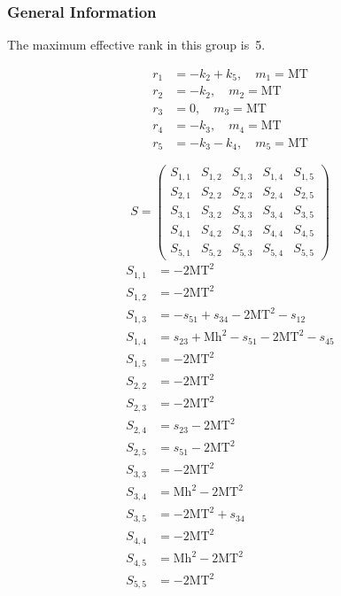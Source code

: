 \documentclass[a4paper]{article}
\begin{document}
\subsubsection*{General Information}
The maximum effective rank in this group is~5.

\begin{subequations}
\begin{align}
r_{1} &= -k_{2}+k_{5},\quad m_{1} = \text{MT}\\
r_{2} &= -k_{2},\quad m_{2} = \text{MT}\\
r_{3} &= 0,\quad m_{3} = \text{MT}\\
r_{4} &= -k_{3},\quad m_{4} = \text{MT}\\
r_{5} &= -k_{3}-k_{4},\quad m_{5} = \text{MT}
\end{align}
\end{subequations}

\begin{equation}
S=\left(\begin{array}{ccccc}
   S_{1,1}&
   S_{1,2}&
   S_{1,3}&
   S_{1,4}&
   S_{1,5}\\
   S_{2,1}&
   S_{2,2}&
   S_{2,3}&
   S_{2,4}&
   S_{2,5}\\
   S_{3,1}&
   S_{3,2}&
   S_{3,3}&
   S_{3,4}&
   S_{3,5}\\
   S_{4,1}&
   S_{4,2}&
   S_{4,3}&
   S_{4,4}&
   S_{4,5}\\
   S_{5,1}&
   S_{5,2}&
   S_{5,3}&
   S_{5,4}&
   S_{5,5}\end{array}\right)
\end{equation}
\begin{subequations}
\begin{align}
   S_{1,1}&=-2\text{MT}^2\\
   S_{1,2}&=-2\text{MT}^2\\
   S_{1,3}&=-s_{51}+s_{34}-2\text{MT}^2-s_{12}\\
   S_{1,4}&=s_{23}+\text{Mh}^2-s_{51}-2\text{MT}^2-s_{45}\\
   S_{1,5}&=-2\text{MT}^2\\
   S_{2,2}&=-2\text{MT}^2\\
   S_{2,3}&=-2\text{MT}^2\\
   S_{2,4}&=s_{23}-2\text{MT}^2\\
   S_{2,5}&=s_{51}-2\text{MT}^2\\
   S_{3,3}&=-2\text{MT}^2\\
   S_{3,4}&=\text{Mh}^2-2\text{MT}^2\\
   S_{3,5}&=-2\text{MT}^2+s_{34}\\
   S_{4,4}&=-2\text{MT}^2\\
   S_{4,5}&=\text{Mh}^2-2\text{MT}^2\\
   S_{5,5}&=-2\text{MT}^2
\end{align}
\end{subequations}
\end{document}
